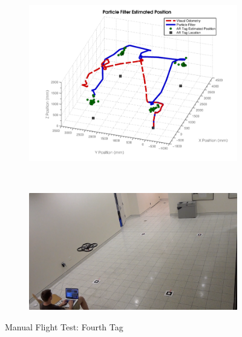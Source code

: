 	\begin{figure}[ht]
	        \centering
	        \begin{subfigure}[b]{0.75\textwidth}
	                \centering
	                \includegraphics[width=\textwidth]{../images/3dgraph_90.png}
	                \label{fig:tag4}
	        \end{subfigure}%
	        \\
	        \begin{subfigure}[b]{0.75\textwidth}
	                \centering
	                \includegraphics[width=\textwidth]{../images/frame4.png}
	                \label{fig:frame4}
	        \end{subfigure}
	        \caption{Manual Flight Test: Fourth Tag}
	\end{figure}

